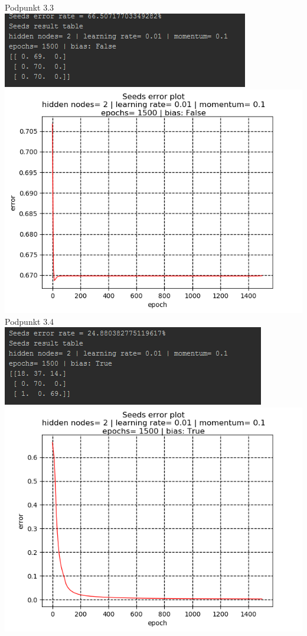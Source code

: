 \documentclass{classrep}
\begin{document}
{Podpunkt 3.3\\
\includegraphics{imgs/331.png}\\
\includegraphics{imgs/332.png}\\
Podpunkt 3.4\\
\includegraphics{imgs/341.png}\\
\includegraphics{imgs/342.png}\\
}
\end{document}
